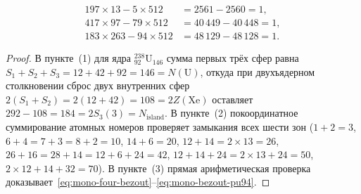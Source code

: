 \begin{theorem}[Периодическая система до 8-го периода, двухсферный перенос урана на остров стабильности $N=184$, закон планетогенеза по 6 зонам диска и четыре тождества Безу на $\mathbb{Z}_{512}$]
\begin{enumerate}[label=\textbf{(\arabic*)},leftmargin=*]
\begin{align}
    197 \times 13 - 5 \times 512 &= 2561 - 2560 = 1, \label{eq:mono-bezout-au197} \\
    417 \times 97 - 79 \times 512 &= 40\,449 - 40\,448 = 1, \label{eq:mono-bezout-au79} \\
    183 \times 263 - 94 \times 512 &= 48\,129 - 48\,128 = 1. \label{eq:mono-bezout-pu94}
  \end{align}
\end{enumerate}
\end{theorem}

\begin{proof}
В пункте~(1) для ядра $^{238}_{92}\mathrm{U}_{146}$ сумма первых трёх сфер равна $S_1 + S_2 + S_3 = 12 + 42 + 92 = 146 = N(\mathrm{U})$, откуда при двухъядерном столкновении сброс двух внутренних сфер $2(S_1 + S_2) = 2(12 + 42) = 108 = 2 Z(\mathrm{Xe})$ оставляет $292 - 108 = 184 = 2 S_3(3) = N_{\mathrm{island}}$. В пункте~(2) покоординатное суммирование атомных номеров проверяет замыкания всех шести зон ($1+2=3$, $6+4=7+3=8+2=10$, $14+6=20$, $12+14=2\times 13=26$, $26+16=28+14=12+6+24=42$, $12+14+24=2\times 13+24=50$, $2\times 12+14+32=70$). В пункте~(3) прямая арифметическая проверка доказывает~\eqref{eq:mono-four-bezout}--\eqref{eq:mono-bezout-pu94}.
\end{proof}

